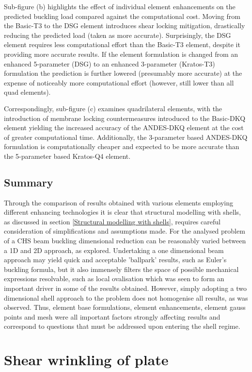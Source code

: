 Sub-figure (b) highlights the effect of individual element enhancements on the predicted buckling load compared against the computational cost. Moving from the Basic-T3 to the DSG element introduces shear locking mitigation, drastically reducing the predicted load (taken as more accurate). Surprisingly, the DSG element requires less computational effort than the Basic-T3 element, despite it providing more accurate results. If the element formulation is changed from an enhanced 5-parameter (DSG) to an enhanced 3-parameter (Kratos-T3) formulation the prediction is further lowered (presumably more accurate) at the expense of noticeably more computational effort (however, still lower than all quad elements).

Correspondingly, sub-figure (c) examines quadrilateral elements, with the introduction of membrane locking countermeasures introduced to the Basic-DKQ element yielding the increased accuracy of the ANDES-DKQ element at the cost of greater computational time. Additionally, the 3-parameter based ANDES-DKQ formulation is computationally cheaper and expected to be more accurate than the 5-parameter based Kratos-Q4 element.

\subsection{Summary}
Through the comparison of results obtained with various elements employing different enhancing technologies it is clear that structural modelling with shells, as discussed in section \ref{Structural modelling with shells}, requires careful consideration of simplifications and assumptions made. For the analysed problem of a CHS beam buckling dimensional reduction can be reasonably varied between a 1D and 2D approach, as explored. Undertaking a one dimensional beam approach may yield quick and acceptable 'ballpark' results, such as Euler's buckling formula, but it also immensely filters the space of possible mechanical expressions resolvable, such as local ovalisation which was seen to form an important driver in some of the results obtained. However, simply adopting a two dimensional shell approach to the problem does not homogenise all results, as was observed. Thus, element base formulations, element enhancements, element gauss points and mesh were all important factors strongly affecting results and correspond to questions that must be addressed upon entering the shell regime. 

\section{Shear wrinkling of plate}

